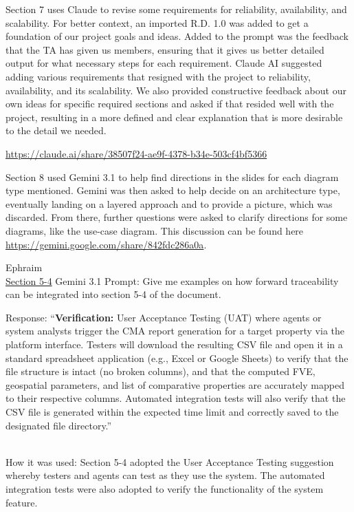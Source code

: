 \documentclass[
]{article}
\begin{document}
Section 7 uses Claude to revise some requirements for reliability,
availability, and scalability. For better context, an imported R.D. 1.0
was added to get a foundation of our project goals and ideas. Added to
the prompt was the feedback that the TA has given us members, ensuring
that it gives us better detailed output for what necessary steps for
each requirement. Claude AI suggested adding various requirements that
resigned with the project to reliability, availability, and its
scalability. We also provided constructive feedback about our own ideas
for specific required sections and asked if that resided well with the
project, resulting in a more defined and clear explanation that is more
desirable to the detail we needed.

\url{https://claude.ai/share/38507f24-ae9f-4378-b34e-503cf4bf5366}

Section 8 used Gemini 3.1 to help find directions in the slides for each
diagram type mentioned. Gemini was then asked to help decide on an
architecture type, eventually landing on a layered approach and to
provide a picture, which was discarded. From there, further questions
were asked to clarify directions for some diagrams, like the use-case
diagram. This discussion can be found here
\url{https://gemini.google.com/share/842fdc286a0a}.

Ephraim\\
\ul{Section 5-4}
Gemini 3.1 Prompt: Give me examples on how forward traceability can be
integrated into section 5-4 of the document.

Response: ``\textbf{Verification:} User Acceptance Testing (UAT) where
agents or system analysts trigger the CMA report generation for a target
property via the platform interface. Testers will download the resulting
CSV file and open it in a standard spreadsheet application (e.g., Excel
or Google Sheets) to verify that the file structure is intact (no broken
columns), and that the computed FVE, geospatial parameters, and list of
comparative properties are accurately mapped to their respective
columns. Automated integration tests will also verify that the CSV file
is generated within the expected time limit and correctly saved to the
designated file directory.''\\
\strut \\
How it was used: Section 5-4 adopted the User Acceptance Testing
suggestion whereby testers and agents can test as they use the system.
The automated integration tests were also adopted to verify the
functionality of the system feature.
\end{document}
